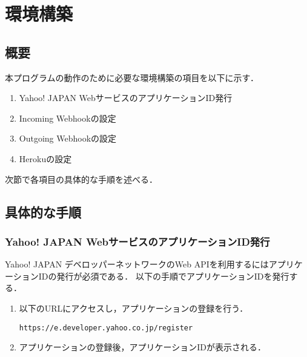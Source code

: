 \documentclass[12pt]{jsarticle}
\begin{document}
\section{環境構築}\label{sec:make environment}
\subsection{概要}\label{subsec:abst environment}
本プログラムの動作のために必要な環境構築の項目を以下に示す．
\begin{enumerate}
\item Yahoo! JAPAN WebサービスのアプリケーションID発行
\item Incoming Webhookの設定
\item Outgoing Webhookの設定
\item Herokuの設定
\end{enumerate}


次節で各項目の具体的な手順を述べる．

\subsection{具体的な手順}\label{subsec:setting environment}
\subsubsection{Yahoo! JAPAN WebサービスのアプリケーションID発行}\label{subsec:get application ID}
Yahoo! JAPAN デベロッパーネットワーク\cite{yahoo_dev}のWeb APIを利用するにはアプリケーションIDの発行が必須である．
以下の手順でアプリケーションIDを発行する．
\begin{enumerate}
\item 以下のURLにアクセスし，アプリケーションの登録を行う．
\begin{verbatim}
https://e.developer.yahoo.co.jp/register
\end{verbatim}
\item アプリケーションの登録後，アプリケーションIDが表示される．\label{enum:get key}
\end{enumerate}
\end{document}
